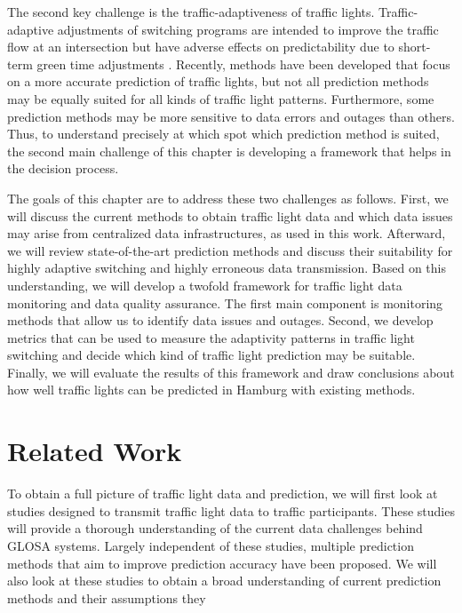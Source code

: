 The second key challenge is the traffic-adaptiveness of traffic lights. Traffic-adaptive adjustments of switching programs are intended to improve the traffic flow at an intersection but have adverse effects on predictability due to short-term green time adjustments \cite{schweiger_elisatm_2011, bodenheimer_enabling_2014}. Recently, methods have been developed that focus on a more accurate prediction of traffic lights, but not all prediction methods may be equally suited for all kinds of traffic light patterns. Furthermore, some prediction methods may be more sensitive to data errors and outages than others. Thus, to understand precisely at which spot which prediction method is suited, the second main challenge of this chapter is developing a framework that helps in the decision process.

The goals of this chapter are to address these two challenges as follows. First, we will discuss the current methods to obtain traffic light data and which data issues may arise from centralized data infrastructures, as used in this work. Afterward, we will review state-of-the-art prediction methods and discuss their suitability for highly adaptive switching and highly erroneous data transmission. Based on this understanding, we will develop a twofold framework for traffic light data monitoring and data quality assurance. The first main component is monitoring methods that allow us to identify data issues and outages. Second, we develop metrics that can be used to measure the adaptivity patterns in traffic light switching and decide which kind of traffic light prediction may be suitable. Finally, we will evaluate the results of this framework and draw conclusions about how well traffic lights can be predicted in Hamburg with existing methods.

\section{Related Work}

To obtain a full picture of traffic light data and prediction, we will first look at studies designed to transmit traffic light data to traffic participants. These studies will provide a thorough understanding of the current data challenges behind GLOSA systems. Largely independent of these studies, multiple prediction methods that aim to improve prediction accuracy have been proposed. We will also look at these studies to obtain a broad understanding of current prediction methods and their assumptions they

